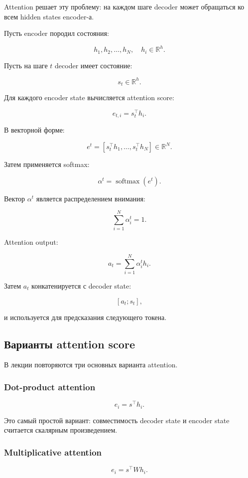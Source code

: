 \documentclass[a4paper,12pt]{article}
\begin{document}
Attention решает эту проблему: на каждом шаге decoder может обращаться ко всем hidden states encoder-а.

Пусть encoder породил состояния:

\[
h_1, h_2, \dots, h_N,
\quad
h_i \in \mathbb{R}^h.
\]

Пусть на шаге \(t\) decoder имеет состояние:

\[
s_t \in \mathbb{R}^h.
\]

Для каждого encoder state вычисляется attention score:

\[
e_{t,i} = s_t^\top h_i.
\]

В векторной форме:

\[
e^t =
[s_t^\top h_1, \dots, s_t^\top h_N]
\in \mathbb{R}^N.
\]

Затем применяется softmax:

\[
\alpha^t = \operatorname{softmax}(e^t).
\]

Вектор \(\alpha^t\) является распределением внимания:

\[
\sum_{i=1}^{N} \alpha_i^t = 1.
\]

Attention output:

\[
a_t =
\sum_{i=1}^{N}
\alpha_i^t h_i.
\]

Затем \(a_t\) конкатенируется с decoder state:

\[
[a_t; s_t],
\]

и используется для предсказания следующего токена.

\subsection{Варианты attention score}

В лекции повторяются три основных варианта attention.

\subsubsection{Dot-product attention}

\[
e_i = s^\top h_i.
\]

Это самый простой вариант: совместимость decoder state и encoder state считается скалярным произведением.

\subsubsection{Multiplicative attention}

\[
e_i = s^\top W h_i.
\]
\end{document}
